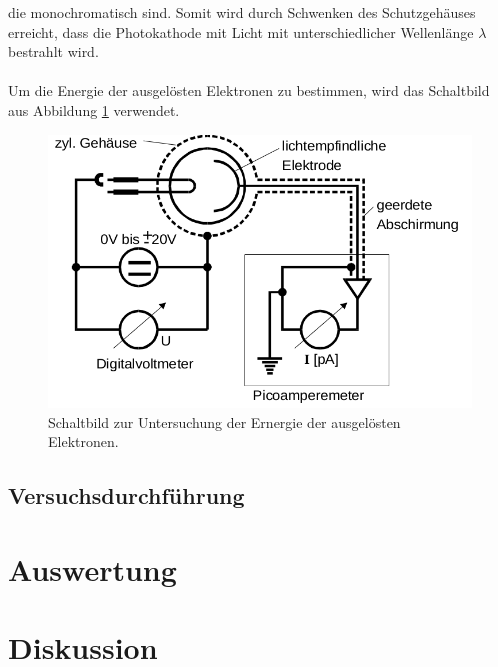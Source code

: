 die monochromatisch sind. Somit wird durch Schwenken des Schutzgehäuses erreicht, dass die Photokathode
mit Licht mit unterschiedlicher Wellenlänge $\lambda$ bestrahlt wird. \\
\\
Um die Energie der ausgelösten Elektronen zu bestimmen, wird das Schaltbild aus Abbildung \ref{fig:4}
verwendet.
\begin{figure}[h]
  \centering
  \includegraphics[scale=0.4]{schaltbild.png}
  \caption{Schaltbild zur Untersuchung der Ernergie der ausgelösten Elektronen.}
  \label{fig:4}
\end{figure}
\subsection{Versuchsdurchführung}

\section{Auswertung}

\section{Diskussion}
\newpage
\nocite{*}
\printbibliography
